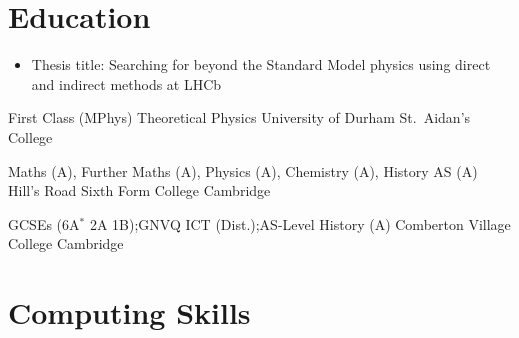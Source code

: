 
\section{Education}
{
  \begin{itemize}
    \item Thesis title:
      Searching for beyond the Standard Model physics using direct and indirect methods at
      LHCb
  \end{itemize}
}
{First Class (MPhys) Theoretical Physics}
{University of Durham {\color{color2} St.~Aidan's College}}
{}{}{}

{Maths (A), Further Maths (A), Physics (A), Chemistry (A), History AS (A)}
{Hill's Road Sixth Form College {\color{color2} Cambridge}}
{}{}{}

{GCSEs (6A$\!^*$ 2A 1B);\hspace{1em}GNVQ ICT (Dist.);\hspace{1em}AS-Level History (A)}
{Comberton Village College {\color{color2} Cambridge}}
{}{}{}

\section{Computing Skills}


